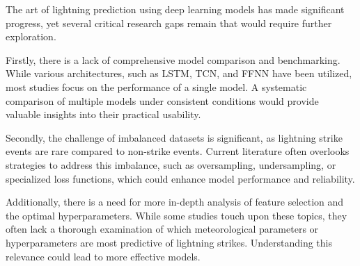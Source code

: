 The art of lightning prediction using deep learning models has made significant progress, yet several critical research gaps remain that would require further exploration.

Firstly, there is a lack of comprehensive model comparison and benchmarking. While various architectures, such as LSTM, TCN, and FFNN have been utilized, most studies focus on the performance of a single model. A systematic comparison of multiple models under consistent conditions would provide valuable insights into their practical usability.

Secondly, the challenge of imbalanced datasets is significant, as lightning strike events are rare compared to non-strike events. Current literature often overlooks strategies to address this imbalance, such as oversampling, undersampling, or specialized loss functions, which could enhance model performance and reliability.

Additionally, there is a need for more in-depth analysis of feature selection and the optimal hyperparameters. While some studies touch upon these topics, they often lack a thorough examination of which meteorological parameters or hyperparameters are most predictive of lightning strikes. Understanding this relevance could lead to more effective models.

